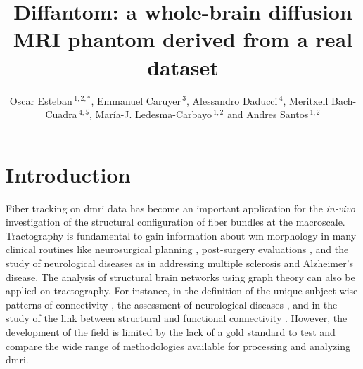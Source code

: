 \documentclass[english]{frontiers/frontiersSCNS} %
\def\firstAuthorLast{Esteban {et~al.}} %
\def\Authors{Oscar Esteban\,$^{1,2,*}$, Emmanuel Caruyer\,$^{3}$, Alessandro Daducci\,$^{4}$, Meritxell Bach-Cuadra\,$^{4,5}$,%
Mar\'ia-J. Ledesma-Carbayo\,$^{1,2}$ and Andres Santos\,$^{1,2}$}
\begin{document}
\onecolumn
{}

\title[Diffantom]{Diffantom: a whole-brain diffusion MRI phantom derived from a real dataset}

\author[\firstAuthorLast ]{\Authors} %
\address{} %
\correspondance{} %

\extraAuth{}%


\maketitle

\linenumbers

\section*{Introduction}
Fiber tracking on \gls*{dmri} data has become an important application for the \textit{in-vivo} investigation
  of the structural configuration of fiber bundles at the macroscale.
Tractography is fundamental to gain information about \gls*{wm} morphology in many clinical routines
  like neurosurgical planning \citep{golby_interactive_2011}, post-surgery evaluations \citep{toda_utility_2014},
  and the study of neurological diseases as in \citep{chua_diffusion_2008} addressing multiple sclerosis and
  Alzheimer's disease.
The analysis of structural brain networks using graph theory can also be applied on tractography.
For instance, in the definition of the unique subject-wise patterns of connectivity
  \citep{sporns_human_2005}, the assessment of neurological diseases \citep{griffa_structural_2013}, and in the
  study of the link between structural and functional connectivity \citep{messe_predicting_2015}.
However, the development of the field is limited by the lack of a gold standard to test and compare the
  wide range of methodologies available for processing and analyzing \gls*{dmri}.
\end{document}
